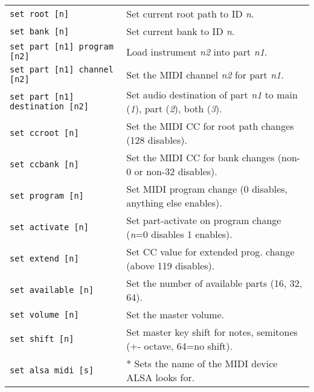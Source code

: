 \begin{table}[H]
\begin{tabular}{l l}
         \texttt{set root [n]} &
            Set current root path to ID \textsl{n}. \\

         \texttt{set bank [n]} &
            Set current bank to ID \textsl{n}. \\

         \texttt{set part [n1] program [n2]} &
            Load instrument \textsl{n2} into part \textsl{n1}. \\

         \texttt{set part [n1] channel [n2]} &
            Set the MIDI channel \textsl{n2} for part \textsl{n1}. \\

         \texttt{set part [n1] destination [n2]} &
            Set audio destination of part \textsl{n1}
            to main (\textsl{1}), part (\textsl{2}), both (\textsl{3}). \\

         \texttt{set ccroot [n]} &
            Set the MIDI CC for root path changes (128 disables). \\

         \texttt{set ccbank [n]} &
            Set the MIDI CC for bank changes (non-0 or non-32 disables). \\

         \texttt{set program [n]} &
            Set MIDI program change (0 disables, anything else enables). \\

         \texttt{set activate [n]} &
            Set part-activate on program change (\textsl{n}=0 disables
            1 enables). \\

         \texttt{set extend [n]} &
            Set CC value for extended prog. change (above 119 disables). \\

         \texttt{set available [n]} &
            Set the number of available parts (16, 32, 64). \\

         \texttt{set volume [n]} &
            Set the master volume. \\

         \texttt{set shift [n]} &
            Set master key shift for notes, semitones (+- octave,
            64=no shift). \\

         \texttt{set alsa midi [s]} &
            * Sets the name of the MIDI device ALSA looks for. \\


\end{tabular}
\end{table}
